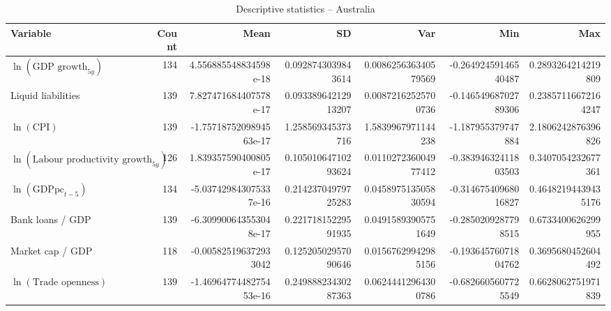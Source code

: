 \begin{table}[!htbp]
\centering
\caption{Descriptive statistics -- Australia}
\footnotesize
\begin{tabular}{lrrrrrr}
\toprule
Variable & Count & Mean & SD & Var & Min & Max \\
\midrule
$\ln(\text{GDP growth}_{5y})$ & 134 & 4.556885548834598e-18 & 0.0928743039843614 & 0.008625636340579569 & -0.26492459146540487 & 0.2893264214219809 \\
Liquid liabilities & 139 & 7.827471684407578e-17 & 0.09338964212913207 & 0.00872162525700736 & -0.14654968702789306 & 0.23857116672164247 \\
$\ln(\text{CPI})$ & 139 & -1.7571875209894563e-17 & 1.258569345373716 & 1.5839967971144238 & -1.187955379747884 & 2.1806242876396826 \\
$\ln(\text{Labour productivity growth}_{5y})$ & 126 & 1.839357590400805e-17 & 0.10501064710293624 & 0.011027236004977412 & -0.38394632411803503 & 0.3407054232677361 \\
$\ln(\text{GDPpc}_{t-5})$ & 134 & -5.037429843075337e-16 & 0.21423704979725283 & 0.045897513505830594 & -0.31467540968016827 & 0.46482194439435176 \\
Bank loans / GDP & 139 & -6.309900643553048e-17 & 0.22171815229591935 & 0.04915893905751649 & -0.2850209287798515 & 0.6733400626299955 \\
Market cap / GDP & 118 & -0.005825196372933042 & 0.12520502957090646 & 0.01567629942985156 & -0.19364576071804762 & 0.3695680452604492 \\
$\ln(\text{Trade openness})$ & 139 & -1.4696477448275453e-16 & 0.24988823430287363 & 0.06244412964300786 & -0.6826605607725549 & 0.6628062751971839 \\
\bottomrule
\end{tabular}
\end{table}


